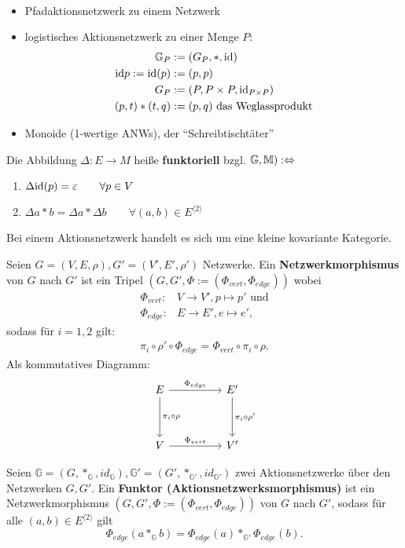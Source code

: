 \begin{beispiel}\
\begin{itemize}
\item Pfadaktionsnetzwerk zu einem Netzwerk
\item logistisches Aktionsnetzwerk zu einer Menge $P$:
\begin{align*}
\mathbb{G}_P&:=(G_P,\ast,\text{id})\\
\text{id} p:=\text{id}(p)&:=(p,p)\\
G_P&:=(P,P\times P,\text{id}_{P\times P})\\
(p,t)\ast(t,q)&:=(p,q)\text{ das Weglassprodukt}
\end{align*}
\item Monoide (1-wertige ANWs), der ``Schreibtischtäter''
\end{itemize}
\end{beispiel}

Die Abbildung $\Delta:E\to M$ heiße \textbf{funktoriell} bzgl. $\mathbb{G},\mathbb{M}):\Leftrightarrow$ 
\begin{enumerate}
\item $\Delta \text{id}(p)=\varepsilon\qquad\forall p\in V$
\item $\Delta a\ast b=\Delta a\ast\Delta b\qquad\forall(a,b)\in E^{\langle2\rangle}$
\end{enumerate}

\begin{bemerkung}
    Bei einem Aktionsnetzwerk handelt es sich um eine kleine kovariante Kategorie.
\end{bemerkung}

\begin{definition}
    Seien $G = (V,E, \rho), G'= (V', E', \rho')$ Netzwerke.
    Ein \textbf{Netzwerkmorphismus} von $G$ nach $G'$ ist ein Tripel $(G, G', \Phi := (\Phi_{vert}, \Phi_{edge}))$  wobei
    \begin{align*}
        \Phi_{vert}:& V \to V', p \mapsto p' \text{ und}\\
        \Phi_{edge}:& E \to E', e \mapsto e',
    \end{align*}
    sodass für $i=1,2$ gilt:
    \begin{align*}
        \pi_i \circ \rho' \circ \Phi_{edge} = \Phi_{vert} \circ \pi_i \circ \rho.
    \end{align*}
    Als kommutatives Diagramm:
    $$\begin{tikzcd}[column sep=huge, row sep=huge]
        E \dar{\pi_i \circ \rho} \rar{\Phi_{edge}} & E' \dar{\pi_i \circ \rho'}\\
        V \rar{\Phi_{vert}} & V' 
    \end{tikzcd}$$
\end{definition}

\begin{definition}
    Seien $\mathbb{G} = (G, \ast_\mathbb{G}, id_\mathbb{G}), \mathbb{G}' = (G', \ast_{\mathbb{G}'}, id_{\mathbb{G}'})$
    zwei Aktionsnetzwerke über den Netzwerken $G,G'$.
    Ein \textbf{Funktor (Aktionsnetzwerksmorphismus)} ist ein Netzwerkmorphismus $(G, G', \Phi := (\Phi_{vert}, \Phi_{edge}))$ von $G$ nach $G'$, 
    sodass für alle $(a,b) \in E^{\langle 2 \rangle}$ gilt
    $$ \Phi_{edge}(a \ast_{\mathbb{G}} b) = \Phi_{edge}(a) \ast_{\mathbb{G}'} \Phi_{edge}(b).$$
\end{definition}

